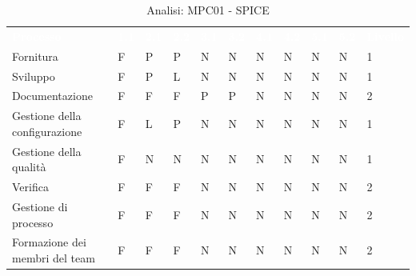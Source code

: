 \begin{table}[H]
        \renewcommand{\arraystretch}{1.5}
        \begin{tabular}{ m{}<{\centering}  m{}<{\centering} m{}<{\centering} m{}<{\centering} m{}<{\centering} m{}<{\centering} m{}<{\centering} m{}<{\centering} m{}<{\centering} m{}<{\centering} m{}<{\centering}}
	\rowcolor{darkblue}
	\textcolor{white}{\textbf{Processo}} &\textcolor{white}{\textbf{1.1}} &\textcolor{white}{\textbf{2.1}} &\textcolor{white}{\textbf{2.2}} &\textcolor{white}{\textbf{3.1}} &\textcolor{white}{\textbf{3.2}} &\textcolor{white}{\textbf{4.1}} &\textcolor{white}{\textbf{4.2}} &\textcolor{white}{\textbf{5.1}} &\textcolor{white}{\textbf{5.2}} &\textcolor{white}{\textbf{Livello}}\\ 
    
    
    Fornitura & F & P & P & N & N & N & N & N & N & 1 \\
    Sviluppo & F & P & L & N & N & N & N & N & N & 1 \\
    Documentazione & F & F & F & P & P & N & N & N & N & 2 \\
    Gestione della configurazione & F & L & P & N & N & N & N & N & N & 1 \\
    Gestione della qualità & F & N & N & N & N & N & N & N & N & 1 \\
    Verifica & F & F & F & N & N & N & N & N & N & 2 \\
   
    Gestione di processo & F & F & F & N & N & N & N & N & N & 2 \\
    Formazione dei membri del team & F & F & F & N & N & N & N & N & N & 2 \\
    
    \end{tabular}
\caption{Analisi: MPC01 - SPICE}
\end{table}

